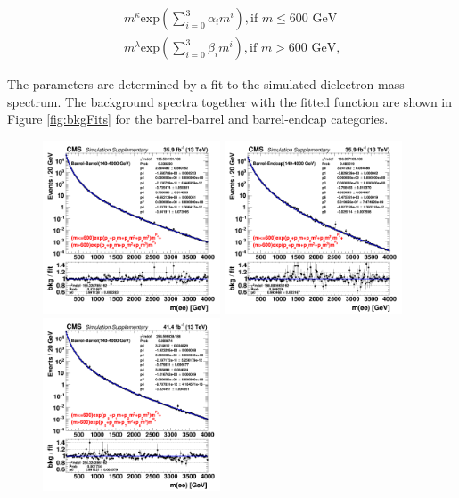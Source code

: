 \begin{equation}
\begin{split}
m^{\kappa}\mathrm{exp}(\sum\limits_{i=0}^3 \alpha_{i} m^{i}), \mbox{if }m \le \mbox{600 GeV} \\
m^{\lambda}\mathrm{exp}(\sum\limits_{i=0}^3 \beta_{i} m^{i}), \mbox{if }m > \mbox{600 GeV,}
\end{split}
\label{eq:bkgshape}
\end{equation}

The parameters are determined by a fit to the simulated dielectron mass spectrum.
The background spectra together with the fitted function are shown in Figure \ref{fig:bkgFits} for the barrel-barrel and barrel-endcap categories.


\begin{figure}
  \begin{center}
    \includegraphics[width=0.47\textwidth]{figures/Zprime/2016/bgkfit/BB_140_4000_bgk.png}
    \includegraphics[width=0.47\textwidth]{figures/Zprime/2016/bgkfit/BE_140_4000_bgk.png}
    \includegraphics[width=0.47\textwidth]{figures/Zprime/2017/bgkfit/BB__bgk.png}

\end{center}
\end{figure}
